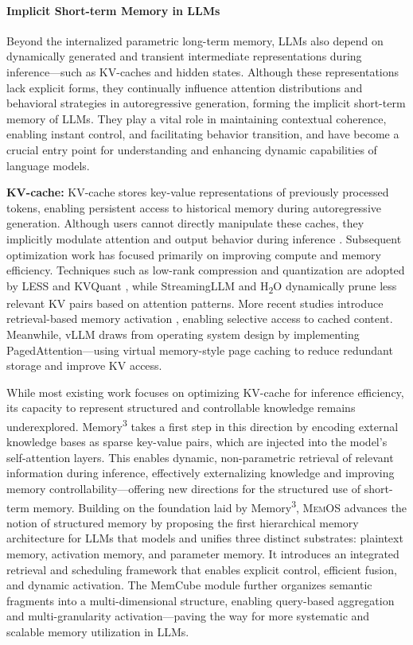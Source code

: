 \documentclass[]{memtensor}
\begin{document}
\paragraph{\textbf{Implicit Short-term Memory in LLMs}}

Beyond the internalized parametric long-term memory, LLMs also depend on dynamically generated and transient intermediate representations during inference—such as KV-caches and hidden states. Although these representations lack explicit forms, they continually influence attention distributions and behavioral strategies in autoregressive generation, forming the implicit short-term memory of LLMs. They play a vital role in maintaining contextual coherence, enabling instant control, and facilitating behavior transition, and have become a crucial entry point for understanding and enhancing dynamic capabilities of language models.

\textbf{KV-cache:} 
KV-cache stores key-value representations of previously processed tokens, enabling persistent access to historical memory during autoregressive generation. Although users cannot directly manipulate these caches, they implicitly modulate attention and output behavior during inference \cite{memory3_Yang_2024}.
Subsequent optimization work has focused primarily on improving compute and memory efficiency. Techniques such as low-rank compression and quantization are adopted by LESS \cite{dong_less_2024} and KVQuant \cite{hooper_kvquant_2024}, while StreamingLLM \cite{xiao_streamingllm_2023} and H\textsubscript{2}O \cite{zhang_h2o_2023} dynamically prune less relevant KV pairs based on attention patterns.
More recent studies introduce retrieval-based memory activation \cite{tang_quest_2024,liu_retrievalattention_2024}, enabling selective access to cached content. Meanwhile, vLLM \cite{kwon_vLLM_2023} draws from operating system design by implementing PagedAttention—using virtual memory-style page caching to reduce redundant storage and improve KV access.

While most existing work focuses on optimizing KV-cache for inference efficiency, its capacity to represent structured and controllable knowledge remains underexplored. Memory\textsuperscript{3} \cite{memory3_Yang_2024} takes a first step in this direction by encoding external knowledge bases as sparse key-value pairs, which are injected into the model’s self-attention layers. This enables dynamic, non-parametric retrieval of relevant information during inference, effectively externalizing knowledge and improving memory controllability—offering new directions for the structured use of short-term memory.
Building on the foundation laid by Memory\textsuperscript{3}, \textsc{MemOS} advances the notion of structured memory by proposing the first hierarchical memory architecture for LLMs that models and unifies three distinct substrates: plaintext memory, activation memory, and parameter memory. It introduces an integrated retrieval and scheduling framework that enables explicit control, efficient fusion, and dynamic activation. The MemCube module further organizes semantic fragments into a multi-dimensional structure, enabling query-based aggregation and multi-granularity activation—paving the way for more systematic and scalable memory utilization in LLMs.
\end{document}
